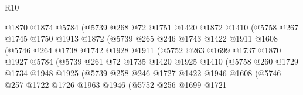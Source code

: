 \begin{lexlean}{R10}
\begin{coremodule}
                        @1870
                        @1874
                        @5784
                        (@5739
                          @268
                          @72
                          @1751
                          @1420
                          @1872
                          @1410
                          (@5758
                            @267
                            @1745
                            @1750
                            @1913
                            @1872
                            (@5739
                              @265
                              @246
                              @1743
                              @1422
                              @1911
                              @1608
                              (@5746
                                @264
                                @1738
                                @1742
                                @1928
                                @1911
                                (@5752
                                  @263
                                  @1699
                                  @1737
                                  @1870
                                  @1927
                                  @5784
                                  (@5739
                                    @261
                                    @72
                                    @1735
                                    @1420
                                    @1925
                                    @1410
                                    (@5758
                                      @260
                                      @1729
                                      @1734
                                      @1948
                                      @1925
                                      (@5739
                                        @258
                                        @246
                                        @1727
                                        @1422
                                        @1946
                                        @1608
                                        (@5746
                                          @257
                                          @1722
                                          @1726
                                          @1963
                                          @1946
                                          (@5752
                                            @256
                                            @1699
                                            @1721

\end{coremodule}
\end{lexlean}
